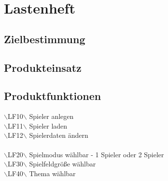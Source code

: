 \clearpage
\chapter{Lastenheft}

\section{Zielbestimmung} %

\section{Produkteinsatz} %

\section{Produktfunktionen} %

$\backslash$LF10$\backslash$ \hspace{15 mm}Spieler anlegen \\
$\backslash$LF11$\backslash$ \hspace{15 mm}Spieler laden\\ %
$\backslash$LF12$\backslash$ \hspace{15 mm}Spielerdaten ändern\\ \\  %

\noindent$\backslash$LF20$\backslash$ \hspace{15 mm}Spielmodus wählbar - 1 Spieler oder 2 Spieler\\
\noindent$\backslash$LF30$\backslash$ \hspace{15 mm}Spielfeldgröße wählbar\\
\noindent$\backslash$LF40$\backslash$ \hspace{15 mm}Thema wählbar\\


